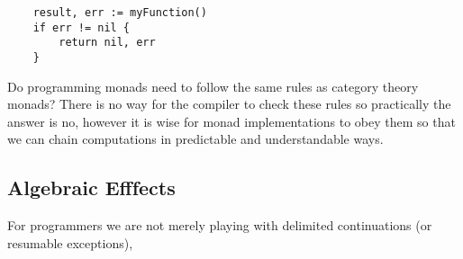 \begin{verbatim}
    result, err := myFunction()
    if err != nil {
        return nil, err
    }
\end{verbatim}

Do programming monads need to follow the same rules as category theory monads?
There is no way for the compiler to check these rules so practically the answer is no,
however it is wise for monad implementations to obey them so that
we can chain computations in predictable and understandable ways.


\subsection{Algebraic Efffects}
For programmers
we are not merely playing with delimited continuations (or resumable exceptions),

